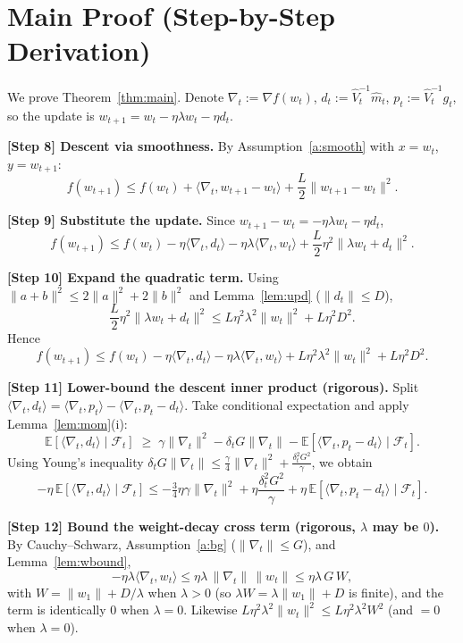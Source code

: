 \documentclass[11pt]{article}
\begin{document}
\section*{Main Proof (Step-by-Step Derivation)}
We prove Theorem~\ref{thm:main}. Denote $\nabla_t := \nabla f(w_t)$,
$d_t := \hat V_t^{-1}\hat m_t$, $p_t:=\hat V_t^{-1}g_t$, so the update is
$w_{t+1} = w_t - \eta\lambda w_t - \eta d_t$.

\noindent\textbf{[Step 8] Descent via smoothness.}
By Assumption~\ref{a:smooth} with $x=w_t$, $y=w_{t+1}$:
\[
f(w_{t+1}) \le f(w_t) + \langle \nabla_t, w_{t+1}-w_t\rangle
+ \frac{L}{2}\|w_{t+1}-w_t\|^2.
\]

\noindent\textbf{[Step 9] Substitute the update.}
Since $w_{t+1}-w_t = -\eta\lambda w_t - \eta d_t$,
\[
f(w_{t+1}) \le f(w_t)
- \eta\langle \nabla_t, d_t\rangle
- \eta\lambda\langle \nabla_t, w_t\rangle
+ \frac{L}{2}\eta^2\|\lambda w_t + d_t\|^2.
\]

\noindent\textbf{[Step 10] Expand the quadratic term.}
Using $\|a+b\|^2\le 2\|a\|^2+2\|b\|^2$ and Lemma~\ref{lem:upd} ($\|d_t\|\le D$),
\[
\frac{L}{2}\eta^2\|\lambda w_t + d_t\|^2
\le L\eta^2\lambda^2\|w_t\|^2 + L\eta^2 D^2 .
\]
Hence
\[
f(w_{t+1}) \le f(w_t)
- \eta\langle \nabla_t, d_t\rangle
- \eta\lambda\langle \nabla_t, w_t\rangle
+ L\eta^2\lambda^2\|w_t\|^2 + L\eta^2 D^2 .
\]

\noindent\textbf{[Step 11] Lower-bound the descent inner product (rigorous).}
Split $\langle\nabla_t,d_t\rangle=\langle\nabla_t,p_t\rangle-\langle\nabla_t,p_t-d_t\rangle$.
Take conditional expectation and apply Lemma~\ref{lem:mom}(i):
\[
\mathbb{E}[\langle\nabla_t,d_t\rangle\mid\mathcal F_t]
\;\ge\; \gamma\|\nabla_t\|^2 - \delta_t G\|\nabla_t\|
- \mathbb{E}[\langle\nabla_t,p_t-d_t\rangle\mid\mathcal F_t].
\]
Using Young's inequality $\delta_t G\|\nabla_t\|\le\frac{\gamma}{4}\|\nabla_t\|^2
+\frac{\delta_t^2 G^2}{\gamma}$, we obtain
\[
-\eta\,\mathbb{E}[\langle\nabla_t,d_t\rangle\mid\mathcal F_t]
\le -\tfrac{3}{4}\eta\gamma\|\nabla_t\|^2
+\eta\frac{\delta_t^2 G^2}{\gamma}
+\eta\,\mathbb{E}[\langle\nabla_t,p_t-d_t\rangle\mid\mathcal F_t].
\]

\noindent\textbf{[Step 12] Bound the weight-decay cross term (rigorous, $\lambda$ may be $0$).}
By Cauchy--Schwarz, Assumption~\ref{a:bg} ($\|\nabla_t\|\le G$), and
Lemma~\ref{lem:wbound},
\[
-\eta\lambda\langle\nabla_t,w_t\rangle
\le \eta\lambda\,\|\nabla_t\|\,\|w_t\|
\le \eta\lambda\,G\,W ,
\]
with $W=\|w_1\|+D/\lambda$ when $\lambda>0$ (so $\lambda W=\lambda\|w_1\|+D$ is finite),
and the term is identically $0$ when $\lambda=0$. Likewise
$L\eta^2\lambda^2\|w_t\|^2\le L\eta^2\lambda^2 W^2$ (and $=0$ when $\lambda=0$).
\end{document}
